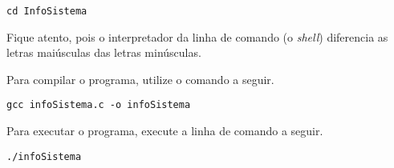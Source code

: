 \begin{lstlisting}[style=MyBashStyle]
cd InfoSistema
\end{lstlisting}

Fique atento, pois o interpretador da linha de comando (o \textit{shell}) diferencia as letras maiúsculas das letras minúsculas.

Para compilar o programa, utilize o comando a seguir.
\begin{lstlisting}[style=MyBashStyle]
gcc infoSistema.c -o infoSistema
\end{lstlisting}

Para executar o programa, execute a linha de comando a seguir.
\begin{lstlisting}[style=MyBashStyle]
./infoSistema
\end{lstlisting}